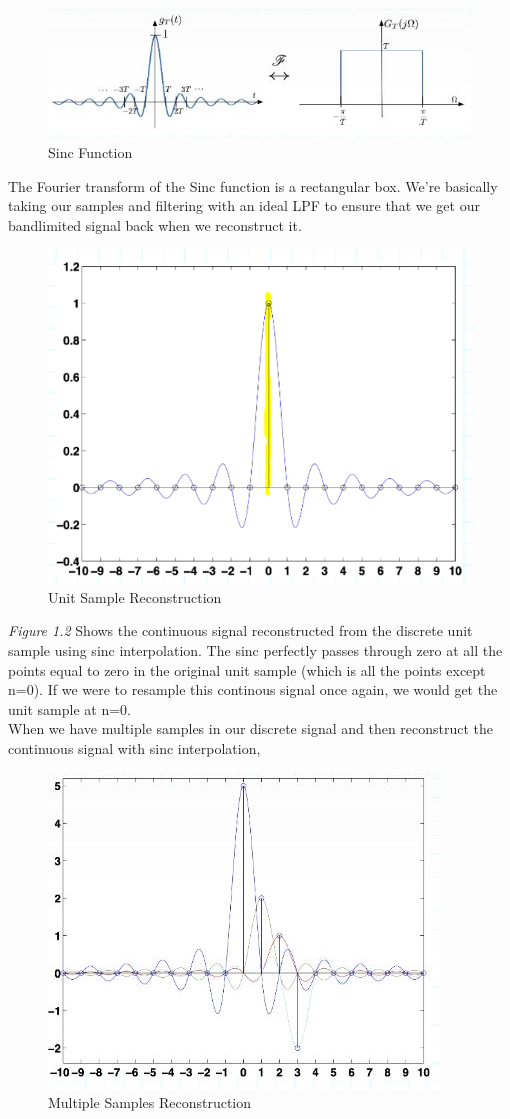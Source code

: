 \documentclass[12pt]{article}
\newcounter{lecture}[section] %
\begin{document}
\begin{figure}[H]
    \centering
    \includegraphics[width=0.75\linewidth]{6250-lecture01-img1.JPG}
    \caption{Sinc Function}
    \label{fig:placeholder}
\end{figure} 
\noindent The Fourier transform of the Sinc function is a rectangular box. We're basically taking our samples and filtering with an ideal LPF to ensure that we get our bandlimited signal back when we reconstruct it. \\
\begin{figure}[H]
    \centering
    \includegraphics[width=0.5\linewidth]{6250-lecture01-im2.png}
    \caption{Unit Sample Reconstruction}
    \label{fig:placeholder}
\end{figure}
\noindent \textit{Figure 1.2} Shows the continuous signal reconstructed from the discrete unit sample using sinc interpolation. The sinc perfectly passes through zero at all the points equal to zero in the original unit sample (which is all the points except n=0). If we were to resample this continous signal once again, we would get the unit sample at n=0.\\
\noindent When we have multiple samples in our discrete signal and then reconstruct the continuous signal with sinc interpolation, 
\begin{figure}[H]
    \centering
    \includegraphics[width=0.5\linewidth]{ece6250-lecture01-img3.JPG}
    \caption{Multiple Samples Reconstruction}
    \label{fig:placeholder}
\end{figure}
\end{document}
